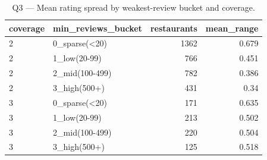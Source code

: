 \begin{table}[ht]
\centering
\caption{Q3 — Mean rating spread by weakest-review bucket and coverage.}
\label{tab:q3_disagreement_by_reviews}
{\tiny
\begin{tabular}{llrr}
\toprule
coverage & min\_reviews\_bucket & restaurants & mean\_range \\
\midrule
2 & 0\_sparse(<20) & 1362 & 0.679 \\
2 & 1\_low(20-99) & 766 & 0.451 \\
2 & 2\_mid(100-499) & 782 & 0.386 \\
2 & 3\_high(500+) & 431 & 0.34 \\
3 & 0\_sparse(<20) & 171 & 0.635 \\
3 & 1\_low(20-99) & 213 & 0.502 \\
3 & 2\_mid(100-499) & 220 & 0.504 \\
3 & 3\_high(500+) & 125 & 0.518 \\
\bottomrule
\end{tabular}
}
\end{table}

